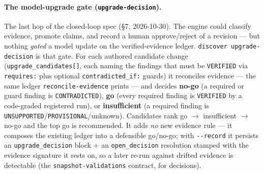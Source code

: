 \documentclass[11pt]{article}
\newcommand{\code}[1]{\texttt{\small #1}}
\begin{document}
\paragraph{The model-upgrade gate (\code{upgrade-decision}).} The last hop of the closed-loop spec
(\S7, 2026-10-30). The engine could classify evidence, promote claims, and record a human
approve/reject of a revision --- but nothing \emph{gated} a model update on the verified-evidence
ledger. \code{discover upgrade-decision} is that gate. For each authored candidate change
(\code{upgrade\_candidates[]}, each naming the findings that must be \code{VERIFIED} via
\code{requires:} plus optional \code{contradicted\_if:} guards) it reconciles evidence --- the same
ledger \code{reconcile-evidence} prints --- and decides \textbf{no-go} (a required or guard finding is
\code{CONTRADICTED}), \textbf{go} (every required finding is \code{VERIFIED} by a code-graded
registered run), or \textbf{insufficient} (a required finding is
\code{UNSUPPORTED}/\code{PROVISIONAL}/unknown). Candidates rank go $\rightarrow$ insufficient
$\rightarrow$ no-go and the top go is recommended. It adds \emph{no} new evidence rule --- it composes
the existing ledger into a defensible go/no-go; with \code{-{}-record} it persists an
\code{upgrade\_decision} block + an \code{open\_decision} resolution stamped with the evidence
signature it rests on, so a later re-run against drifted evidence is detectable (the
\code{snapshot-validations} contract, for decisions).
\end{document}
